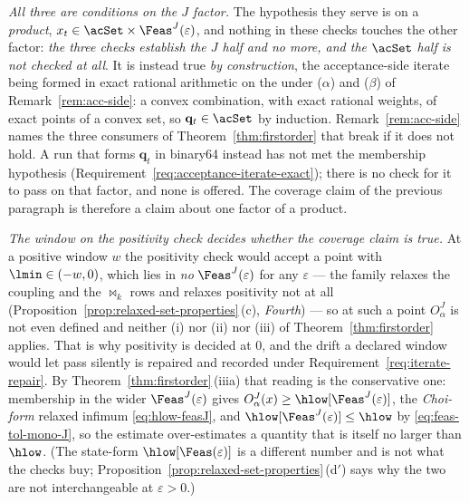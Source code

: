 \begin{remark}
\emph{All three are conditions on the $J$ factor.} The hypothesis they
serve is on a \emph{product}, $x_t\in\acSet\times\Feas^{J}(\varepsilon)$,
and nothing in these checks touches the other factor: \emph{the three
checks establish the $J$ half and no more, and the $\acSet$ half is not
checked at all}. It is instead true \emph{by construction}, the
acceptance-side iterate being formed in exact rational arithmetic on the
 under ($\alpha$) and ($\beta$) of
Remark~\ref{rem:acc-side}: a convex combination, with exact rational
weights, of exact points of a convex set, so $\mathbf q_t\in\acSet$ by
induction. Remark~\ref{rem:acc-side} names the three consumers of
Theorem~\ref{thm:firstorder} that break if it does not hold. A run that
forms $\mathbf q_t$ in binary64 instead has not met the membership
hypothesis (Requirement~\ref{req:acceptance-iterate-exact}); there is no
check for it to pass on that factor, and none is offered. The coverage
claim of the previous paragraph is therefore a claim about one factor of a
product.

\emph{The window on the positivity check decides whether the coverage claim
is true.} At a positive window $w$ the positivity check would accept a
point with $\lmin\in(-w,0)$, which lies in \emph{no}
$\Feas^{J}(\varepsilon)$ for any $\varepsilon$ --- the family relaxes the
coupling and the $\bowtie_k$ rows and relaxes positivity not at all
(Proposition~\ref{prop:relaxed-set-properties}\,(c), \emph{Fourth}) --- so
at such a point $O^{J}_{\alpha}$ is not even defined and neither (i) nor
(ii) nor (iii) of Theorem~\ref{thm:firstorder} applies. That is why
positivity is decided at $0$, and the drift a declared window would let
pass silently is repaired and recorded under
Requirement~\ref{req:iterate-repair}. By
Theorem~\ref{thm:firstorder}\,(iiia) that reading is the conservative one:
membership in the wider $\Feas^{J}(\varepsilon)$ gives
$O^{J}_{\alpha}(x)\ge\hlow[\Feas^{J}(\varepsilon)]$, the \emph{Choi-form}
relaxed infimum \eqref{eq:hlow-feasJ}, and
$\hlow[\Feas^{J}(\varepsilon)]\le\hlow$ by \eqref{eq:feas-tol-mono-J}, so
the estimate over-estimates a quantity that is itself no larger than
$\hlow$. (The state-form $\hlow[\Feas(\varepsilon)]$ is a different number
and is not what the checks buy;
Proposition~\ref{prop:relaxed-set-properties}\,(d$'$) says why the two are
not interchangeable at $\varepsilon>0$.)
\end{remark}
